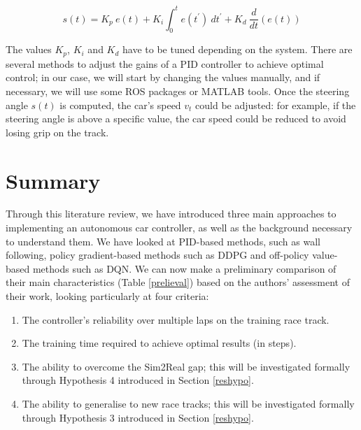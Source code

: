 \begin{equation}
	\label{pid}
	s(t) = K_p \: e(t) + K_i \int_0^{t} e(t^{'}) \: dt^{'} + K_d \: \frac{d}{dt}(e(t))
\end{equation}

The values $K_p$, $K_i$ and $K_d$ have to be tuned depending on the system. There are several methods to adjust the gains of a PID controller to achieve optimal control; in our case, we will start by changing the values manually, and if necessary, we will use some ROS packages or MATLAB tools.\newline
Once the steering angle $s(t)$ is computed, the car's speed $v_{t}$ could be adjusted: for example, if the steering angle is above a specific value, the car speed could be reduced to avoid losing grip on the track.

\section{Summary}
Through this literature review, we have introduced three main approaches to implementing an autonomous car controller, as well as the background necessary to understand them. We have looked at PID-based methods, such as wall following, policy gradient-based methods such as DDPG and off-policy value-based methods such as DQN. \newline
We can now make a preliminary comparison of their main characteristics (Table \ref{prelieval}) based on the authors' assessment of their work, looking particularly at four criteria:
\begin{enumerate}
	\item The controller's reliability over multiple laps on the training race track.
	\item The training time required to achieve optimal results (in steps).
	\item The ability to overcome the Sim2Real gap; this will be investigated formally through Hypothesis 4 introduced in Section \ref{reshypo}.
	\item The ability to generalise to new race tracks; this will be investigated formally through Hypothesis 3 introduced in Section \ref{reshypo}.
\end{enumerate}

